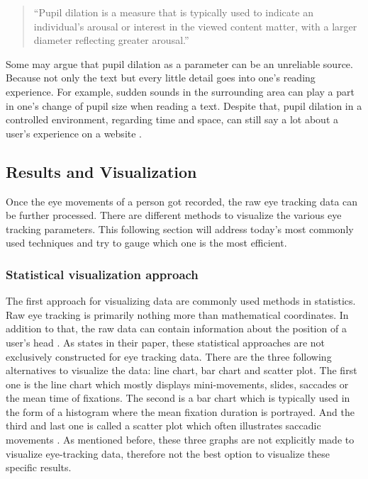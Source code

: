 \begin{quote}
``Pupil dilation is a measure that is typically used to indicate an individual’s arousal or interest in the viewed content matter, with a larger diameter reflecting greater arousal.''
\autocite[3]{joachims2017accurately}
\end{quote}

Some may argue that pupil dilation as a parameter can be an unreliable source. 
Because not only the text but every little detail goes into one's reading experience. For example, sudden sounds in the surrounding area can play a part in one's change of pupil size when reading a text. 
Despite that, pupil dilation in a controlled environment, regarding time and space, can still say a lot about a user's experience on a website \autocite[]{bruneau2002eyes}.

\subsection{Results and Visualization}
\label{subsection:ResultsVisualization}
Once the eye movements of a person got recorded, the raw eye tracking data can be further processed. There are different methods to visualize the various eye tracking parameters. This following section will address today's most commonly used techniques and try to gauge which one is the most efficient.

\subsubsection{Statistical visualization approach}
The first approach for visualizing data are commonly used methods in statistics. Raw eye tracking is primarily nothing more than mathematical coordinates. In addition to that, the raw data can contain information about the position of a user's head \autocite[]{bruneau2002eyes, biedert2010eyebook, kurzhals2016gaze}. 
As \textcite[]{blascheck2014state} states in their paper, these statistical approaches are not exclusively constructed for eye tracking data. There are the three following alternatives to visualize the data: line chart, bar chart and scatter plot. The first one is the line chart which mostly displays mini-movements, slides, saccades or the mean time of fixations. The second is a bar chart which is typically used in the form of a histogram where the mean fixation duration is portrayed. And the third and last one is called a scatter plot which often illustrates saccadic movements \autocite[]{blascheck2014state}.
As mentioned before, these three graphs are not explicitly made to visualize eye-tracking data, therefore not the best option to visualize these specific results.

